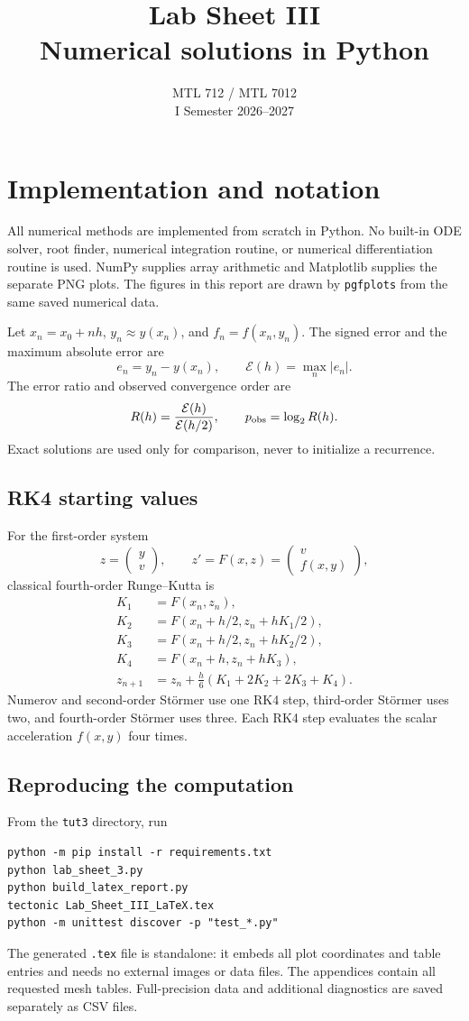 \documentclass[11pt,a4paper]{article}
\title{\color{reportblue}\textbf{Lab Sheet III}\\[4pt]Numerical solutions in Python}
\author{MTL 712 / MTL 7012\\I Semester 2026--2027}
\date{}
\newcommand{\St}{St\"ormer}
\newcommand{\err}{\mathcal E}
\begin{document}
\maketitle
\tableofcontents
\clearpage
\section*{Implementation and notation}
All numerical methods are implemented from scratch in Python. No built-in
ODE solver, root finder, numerical integration routine, or numerical
differentiation routine is used. NumPy supplies array arithmetic and
Matplotlib supplies the separate PNG plots. The figures in this report are
drawn by \texttt{pgfplots} from the same saved numerical data.

Let $x_n=x_0+nh$, $y_n\approx y(x_n)$, and $f_n=f(x_n,y_n)$.
The signed error and the maximum absolute error are
\[
e_n=y_n-y(x_n),\qquad \err(h)=\max_n|e_n|.
\]
The error ratio and observed convergence order are
\[
R(h)=\frac{\err(h)}{\err(h/2)},\qquad p_{\rm obs}=\log_2 R(h).
\]
Exact solutions are used only for comparison, never to initialize a recurrence.

\subsection*{RK4 starting values}
For the first-order system
\[
z=\begin{pmatrix}y\\v\end{pmatrix},\qquad
z'=F(x,z)=\begin{pmatrix}v\\f(x,y)\end{pmatrix},
\]
classical fourth-order Runge--Kutta is
\begin{align*}
K_1&=F(x_n,z_n),\\
K_2&=F(x_n+h/2,z_n+hK_1/2),\\
K_3&=F(x_n+h/2,z_n+hK_2/2),\\
K_4&=F(x_n+h,z_n+hK_3),\\
z_{n+1}&=z_n+\frac h6(K_1+2K_2+2K_3+K_4).
\end{align*}
Numerov and second-order \St{} use one RK4 step, third-order \St{} uses
two, and fourth-order \St{} uses three. Each RK4 step evaluates the scalar
acceleration $f(x,y)$ four times.

\subsection*{Reproducing the computation}
From the \texttt{tut3} directory, run
\begin{verbatim}
python -m pip install -r requirements.txt
python lab_sheet_3.py
python build_latex_report.py
tectonic Lab_Sheet_III_LaTeX.tex
python -m unittest discover -p "test_*.py"
\end{verbatim}
The generated \texttt{.tex} file is standalone: it embeds all plot coordinates
and table entries and needs no external images or data files.
The appendices contain all requested mesh tables. Full-precision data and
additional diagnostics are saved separately as CSV files.
\end{document}
